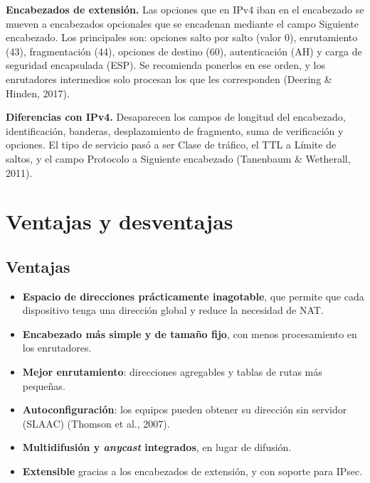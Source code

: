 \documentclass[12pt,letterpaper]{article}
\begin{document}
\textbf{Encabezados de extensión.} Las opciones que en IPv4 iban en el encabezado se mueven a encabezados opcionales que se encadenan mediante el campo Siguiente encabezado. Los principales son: opciones salto por salto (valor 0), enrutamiento (43), fragmentación (44), opciones de destino (60), autenticación (AH) y carga de seguridad encapsulada (ESP). Se recomienda ponerlos en ese orden, y los enrutadores intermedios solo procesan los que les corresponden (Deering \& Hinden, 2017).

\textbf{Diferencias con IPv4.} Desaparecen los campos de longitud del encabezado, identificación, banderas, desplazamiento de fragmento, suma de verificación y opciones. El tipo de servicio pasó a ser Clase de tráfico, el TTL a Límite de saltos, y el campo Protocolo a Siguiente encabezado (Tanenbaum \& Wetherall, 2011).

\section{Ventajas y desventajas}
\subsection{Ventajas}
\begin{itemize}
\item \textbf{Espacio de direcciones prácticamente inagotable}, que permite que cada dispositivo tenga una dirección global y reduce la necesidad de NAT.
\item \textbf{Encabezado más simple y de tamaño fijo}, con menos procesamiento en los enrutadores.
\item \textbf{Mejor enrutamiento}: direcciones agregables y tablas de rutas más pequeñas.
\item \textbf{Autoconfiguración}: los equipos pueden obtener su dirección sin servidor (SLAAC) (Thomson et al., 2007).
\item \textbf{Multidifusión y \emph{anycast} integrados}, en lugar de difusión.
\item \textbf{Extensible} gracias a los encabezados de extensión, y con soporte para IPsec.
\end{itemize}
\end{document}
